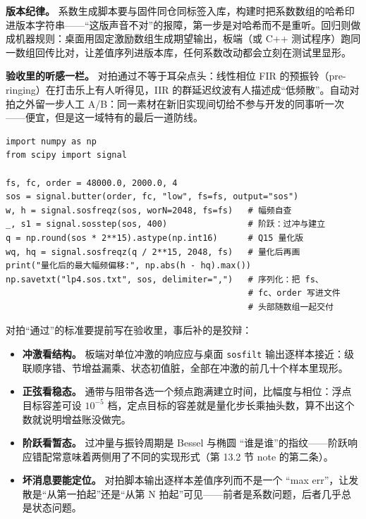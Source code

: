 \documentclass[12pt,a4paper,fontset=fandol]{ctexbook}
\newcommand{\Tp}[1]{\texttt{#1}}
\begin{document}
\textbf{版本纪律。} 系数生成脚本要与固件同仓同标签入库，构建时把系数数组的哈希印进版本字符串——``这版声音不对''的报障，第一步是对哈希而不是重听。回归则做成机器规则：桌面用固定激励数组生成期望输出，板端（或 C++ 测试程序）跑同一数组回传比对，让差值序列进版本库，任何系数改动都会立刻在测试里显形。

\textbf{验收里的听感一栏。} 对拍通过不等于耳朵点头：线性相位 FIR 的预振铃（pre-ringing）在打击乐上有人听得见，IIR 的群延迟纹波有人描述成``低频散''。自动对拍之外留一步人工 A/B：同一素材在新旧实现间切给不参与开发的同事听一次——便宜，但是这一域特有的最后一道防线。

\begin{lstlisting}[style=pythonstyle,caption={设计回路的最小脚本：生成 SOS、自查频响与阶跃、量化核对、导出}]
import numpy as np
from scipy import signal

fs, fc, order = 48000.0, 2000.0, 4
sos = signal.butter(order, fc, "low", fs=fs, output="sos")
w, h = signal.sosfreqz(sos, worN=2048, fs=fs)   # 幅频自查
_, s1 = signal.sosstep(sos, 400)                # 阶跃：过冲与建立
q = np.round(sos * 2**15).astype(np.int16)      # Q15 量化版
wq, hq = signal.sosfreqz(q / 2**15, 2048, fs)   # 量化后再画
print("量化后的最大幅频偏移:", np.abs(h - hq).max())
np.savetxt("lp4.sos.txt", sos, delimiter=",")   # 序列化：把 fs、
                                                # fc、order 写进文件
                                                # 头部随数组一起交付
\end{lstlisting}

对拍``通过''的标准要提前写在验收里，事后补的是狡辩：

\begin{itemize}
\item \textbf{冲激看结构。} 板端对单位冲激的响应应与桌面 \Tp{sosfilt} 输出逐样本接近：级联顺序错、节增益漏乘、状态初值脏，全部在冲激的前几十个样本里现形。
\item \textbf{正弦看稳态。} 通带与阻带各选一个频点跑满建立时间，比幅度与相位：浮点目标容差可设 $10^{-5}$ 档，定点目标的容差就是量化步长乘抽头数，算不出这个数就说明增益账没做完。
\item \textbf{阶跃看暂态。} 过冲量与振铃周期是 Bessel 与椭圆 ``谁是谁''的指纹——阶跃响应错配常意味着两侧用了不同的实现形式（第 13.2 节 note 的第二条）。
\item \textbf{坏消息要能定位。} 对拍脚本输出逐样本差值序列而不是一个 ``max err''，让发散是``从第一拍起''还是``从第 N 拍起''可见——前者是系数问题，后者几乎总是状态问题。
\end{itemize}
\end{document}

